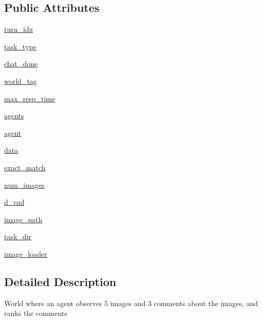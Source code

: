 \subsection*{Public Attributes}
\begin{DoxyCompactItemize}
\item 
\hyperlink{classigc__evals_1_1worlds_1_1MTurkIGCEvalWorld_a3bcc7bb6425e13848844cbb318503685}{turn\+\_\+idx}
\item 
\hyperlink{classigc__evals_1_1worlds_1_1MTurkIGCEvalWorld_ab893bcfbc17987bd7512731901791dd3}{task\+\_\+type}
\item 
\hyperlink{classigc__evals_1_1worlds_1_1MTurkIGCEvalWorld_ad9ae8b1e6e745aad24b2822fb19a7a85}{chat\+\_\+done}
\item 
\hyperlink{classigc__evals_1_1worlds_1_1MTurkIGCEvalWorld_a71ee5ba95de2b115ad926db20bf88ae4}{world\+\_\+tag}
\item 
\hyperlink{classigc__evals_1_1worlds_1_1MTurkIGCEvalWorld_aa203efe5c124b3400572cadb57a3774f}{max\+\_\+resp\+\_\+time}
\item 
\hyperlink{classigc__evals_1_1worlds_1_1MTurkIGCEvalWorld_af9ffc523ad51ee58a30f5b9ddee453be}{agents}
\item 
\hyperlink{classigc__evals_1_1worlds_1_1MTurkIGCEvalWorld_a2d85992a36e835c15f629b2ad0cd098d}{agent}
\item 
\hyperlink{classigc__evals_1_1worlds_1_1MTurkIGCEvalWorld_a074e88bda6e2160158b247b1a6d41a7d}{data}
\item 
\hyperlink{classigc__evals_1_1worlds_1_1MTurkIGCEvalWorld_adba95a00457b873e53ea8e78029c63f9}{exact\+\_\+match}
\item 
\hyperlink{classigc__evals_1_1worlds_1_1MTurkIGCEvalWorld_a74353f0142ea14589f660799b33aec27}{num\+\_\+images}
\item 
\hyperlink{classigc__evals_1_1worlds_1_1MTurkIGCEvalWorld_a217e4c01c668988579b89568f8d240fd}{d\+\_\+rnd}
\item 
\hyperlink{classigc__evals_1_1worlds_1_1MTurkIGCEvalWorld_a3ef9075020f751d5e24f99c9f26007b3}{image\+\_\+path}
\item 
\hyperlink{classigc__evals_1_1worlds_1_1MTurkIGCEvalWorld_a2c16cf5673b1546b5a87d74f1bfdc486}{task\+\_\+dir}
\item 
\hyperlink{classigc__evals_1_1worlds_1_1MTurkIGCEvalWorld_ab7440083f9c0ff4759784d4e54c1d8d8}{image\+\_\+loader}
\end{DoxyCompactItemize}


\subsection{Detailed Description}
\begin{DoxyVerb}World where an agent observes 5 images and 3 comments about the images,
   and ranks the comments
\end{DoxyVerb}
 

